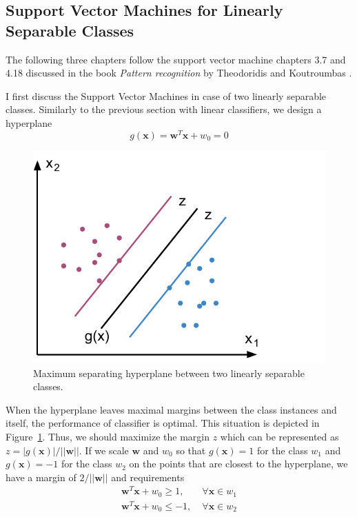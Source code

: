 \subsection{Support Vector Machines for Linearly Separable Classes}
The following three chapters follow the support vector machine chapters 3.7 and 4.18 discussed in the book \emph{Pattern recognition} by Theodoridis and Koutroumbas \cite{PatternRecognition}.

I first discuss the Support Vector Machines in case of two linearly separable classes. Similarly to the previous section with linear classifiers, we design a hyperplane
\begin{equation}
g(\mathbf{x}) = \mathbf{w}^T \mathbf{x} + w_0 = 0
\end{equation}

\begin{figure}[here]
\centering
\includegraphics[scale=0.7]{images/svm_linear.pdf}
\caption{Maximum separating hyperplane between two linearly separable classes.}
\label{fig:svm_linear}
\end{figure}

When the hyperplane leaves maximal margins between the class instances and itself, the performance of classifier is optimal. This situation is depicted in Figure~\ref{fig:svm_linear}. Thus, we should maximize the margin $z$ which can be represented as $z = |g(\mathbf{x})| / ||\mathbf{w}||$. If we scale $\mathbf{w}$ and $w_0$ so that $g(\mathbf{x}) = 1$ for the class $w_1$ and $g(\mathbf{x}) = -1$ for the class $w_2$ on the points that are closest to the hyperplane, we have a margin of $2 / ||\mathbf{w}||$ and requirements
\begin{align}
\mathbf{w}^T \mathbf{x} + w_0 \ge 1, &\; \forall \mathbf{x} \in w_1 \\
\mathbf{w}^T \mathbf{x} + w_0 \le -1, &\; \forall \mathbf{x} \in w_2
\end{align}

